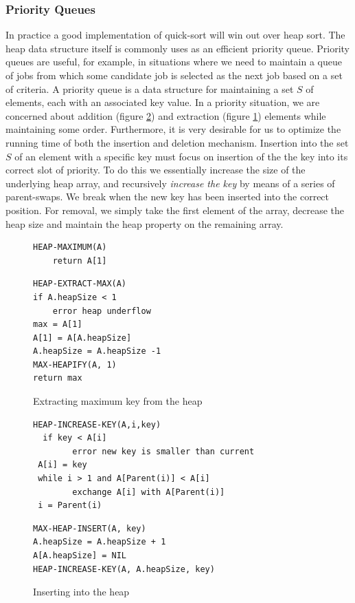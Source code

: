 \documentclass[10pt,a4paper]{article}
\begin{document}
\subsubsection{Priority Queues}
In practice a good implementation of quick-sort will win out over heap sort. The heap data structure itself is commonly uses as an efficient priority queue. Priority queues are useful, for example, in situations where we need to maintain a queue of jobs from which some candidate job is selected as the next job based on a set of criteria. 
\newline\newline
A priority queue is a data structure for maintaining a set $S$ of elements, each with an associated key value. In a priority situation, we are concerned about addition (figure \ref{heapinsert}) and extraction (figure \ref{heapremove}) elements while maintaining some order. Furthermore, it is very desirable for us to optimize the running time of both the insertion and deletion mechanism. Insertion into the set $S$ of an element with a specific key must focus on insertion of the the key into its correct slot of priority. To do this we essentially increase the size of the underlying heap array, and recursively {\it increase the key} by means of a series of parent-swaps. We break when the new key has been inserted into the correct position. For removal, we simply take the first element of the array, decrease the heap size and maintain the heap property on the remaining array. 



\begin{figure}
\caption{Extracting maximum key from the heap \cite{INTROALG}}
\begin{center}

\begin{lstlisting}
HEAP-MAXIMUM(A)
	return A[1]
\end{lstlisting}

\begin{lstlisting}
HEAP-EXTRACT-MAX(A)
if A.heapSize < 1 
	error heap underflow
max = A[1]
A[1] = A[A.heapSize]
A.heapSize = A.heapSize -1 
MAX-HEAPIFY(A, 1)
return max
\end{lstlisting}
\label{heapremove}
\end{center}
\end{figure}




\begin{figure}
\caption{Inserting into the heap \cite{INTROALG}}
\begin{center}
\begin{lstlisting}
HEAP-INCREASE-KEY(A,i,key)
  if key < A[i]
        error new key is smaller than current
 A[i] = key
 while i > 1 and A[Parent(i)] < A[i]
        exchange A[i] with A[Parent(i)]
 i = Parent(i)
\end{lstlisting}

\begin{lstlisting}
MAX-HEAP-INSERT(A, key)
A.heapSize = A.heapSize + 1
A[A.heapSize] = NIL
HEAP-INCREASE-KEY(A, A.heapSize, key)
\end{lstlisting}
\label{heapinsert}
\end{center}
\end{figure}
\end{document}
